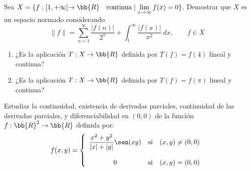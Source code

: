 \documentclass[12pt]{article}
\begin{document}
    \begin{ejercicio}[3 puntos] Sea $X=\{f:[1,+\infty[\to \bb{R} \quad \text{continua} \mid \lim\limits_{x\to \infty} f(x)=0\}$. Demostrar que $X$ es un espacio normado considerando
    \begin{equation*}
        \|f\| = \sum_{n=1}^\infty \frac{|f(n)|}{2^n} + \int_1^\infty \frac{|f(x)|}{x^2}~dx,\qquad f\in X
    \end{equation*}
        \begin{enumerate}
            \item ¿Es la aplicación $T:X\to \bb{R}$ definida por $T(f)=f(4)$ lineal y continua?
            \item ¿Es la aplicación $T:X\to \bb{R}$ definida por $T(f)=f(\pi)$ lineal y continua?
        \end{enumerate}
    \end{ejercicio}

    \begin{ejercicio}[3 puntos] Estudiar la continuidad, existencia de derivadas parciales, continuidad de las derivadas parciales, y diferenciabilidad en $(0,0)$ de la función $f:\bb{R}^2 \to \bb{R}$ definida por:
    \begin{equation*}
        f(x,y) = \left\{\begin{array}{ccc}
            \dfrac{x^2+y^2}{|x| + |y|}\sen(xy) & \text{si} & (x,y)\neq (0,0) \\ \\
            0 & \text{si} & (x,y)= (0,0)
        \end{array}\right.
    \end{equation*}
    \end{ejercicio}
\end{document}
